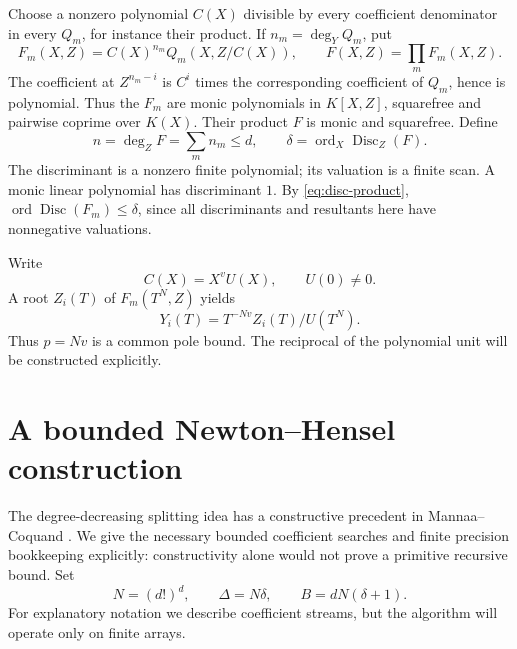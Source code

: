 \documentclass[11pt]{article}
\theoremstyle{definition}
\newcommand{\ord}{\operatorname{ord}}
\newcommand{\disc}{\operatorname{Disc}}
\begin{document}
Choose a nonzero polynomial \(C(X)\) divisible by every coefficient
denominator in every \(Q_m\), for instance their product.
If \(n_m=\deg_YQ_m\), put
\[
 F_m(X,Z)=C(X)^{n_m}Q_m(X,Z/C(X)),\qquad F(X,Z)=\prod_mF_m(X,Z).
\]
The coefficient at \(Z^{n_m-i}\) is \(C^i\) times the corresponding
coefficient of \(Q_m\), hence is polynomial. Thus the \(F_m\) are monic
polynomials in \(K[X,Z]\), squarefree and pairwise coprime over \(K(X)\).
Their product \(F\) is monic and squarefree. Define
\[
 n=\deg_ZF=\sum_m n_m\le d,\qquad \delta=\ord_X\disc_Z(F).
\]
The discriminant is a nonzero finite polynomial; its valuation is a finite
scan. A monic linear polynomial has discriminant \(1\).
By \eqref{eq:disc-product}, \(\ord\disc(F_m)\le\delta\), since all
discriminants and resultants here have nonnegative valuations.

Write
\begin{equation}
 C(X)=X^vU(X),\qquad U(0)\ne0.
 \label{eq:C-unit}
\end{equation}
A root \(Z_i(T)\) of \(F_m(T^N,Z)\) yields
\[
 Y_i(T)=T^{-Nv}Z_i(T)/U(T^N).
\]
Thus \(p=Nv\) is a common pole bound. The reciprocal of the polynomial
unit will be constructed explicitly.

\section{A bounded Newton--Hensel construction}
\label{sec:newton}
The degree-decreasing splitting idea has a constructive precedent in
Mannaa--Coquand \cite{mannaa}. We give the necessary bounded coefficient
searches and finite precision bookkeeping explicitly: constructivity alone
would not prove a primitive recursive bound.
Set
\begin{equation}
 N=(d!)^d,\qquad \Delta=N\delta,\qquad B=dN(\delta+1).
 \label{eq:budgets}
\end{equation}
For explanatory notation we describe coefficient streams, but the algorithm
will operate only on finite arrays.
\end{document}
